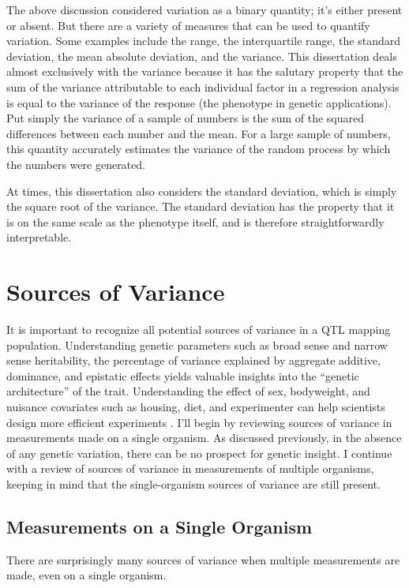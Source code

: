 The above discussion considered variation as a binary quantity; it's either present or absent.
But there are a variety of measures that can be used to quantify variation.
Some examples include the range, the interquartile range, the standard deviation, the mean absolute deviation, and the variance.
This dissertation deals almost exclusively with the variance because it has the salutary property that the sum of the variance attributable to each individual factor in a regression analysis is equal to the variance of the response (the phenotype in genetic applications).
Put simply the variance of a sample of numbers is the sum of the squared differences between each number and the mean.
For a large sample of numbers, this quantity accurately estimates the variance of the random process by which the numbers were generated.

At times, this dissertation also considers the standard deviation, which is simply the square root of the variance.
The standard deviation has the property that it is on the same scale as the phenotype itself, and is therefore straightforwardly interpretable.

\section{Sources of Variance}

It is important to recognize all potential sources of variance in a QTL mapping population.
Understanding genetic parameters such as broad sense and narrow sense heritability, the percentage of variance explained by aggregate additive, dominance, and epistatic effects yields valuable insights into the ``genetic architecture'' of the trait.
Understanding the effect of sex, bodyweight, and nuisance covariates such as housing, diet, and experimenter can help scientists design more efficient experiments \citep{Nettleton2006,Datta2014}.
I'll begin by reviewing sources of variance in measurements made on a single organism.
As discussed previously, in the absence of any genetic variation, there can be no prospect for genetic insight.
I continue with a review of sources of variance in measurements of multiple organisms, keeping in mind that the single-organism sources of variance are still present.


\subsection{Measurements on a Single Organism}

There are surprisingly many sources of variance when multiple measurements are made, even on a single organism. %

